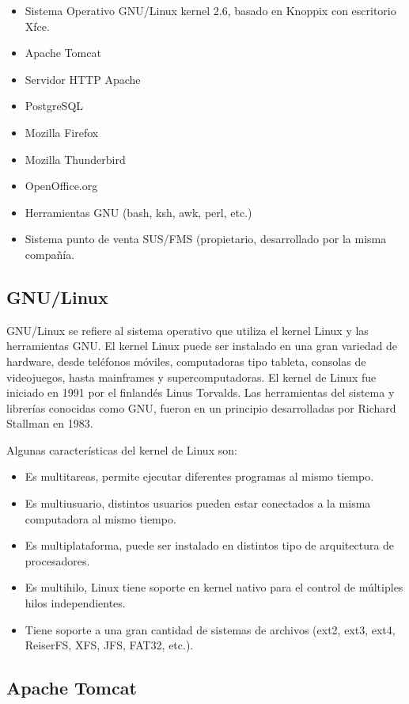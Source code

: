 \begin{itemize}
 \item Sistema Operativo GNU/Linux kernel 2.6, basado en Knoppix con escritorio Xfce.
 \item Apache Tomcat
 \item Servidor HTTP Apache
 \item PostgreSQL
 \item Mozilla Firefox
 \item Mozilla Thunderbird
 \item OpenOffice.org
 \item Herramientas GNU (bash, ksh, awk, perl, etc.)
 \item Sistema punto de venta SUS/FMS (propietario, desarrollado por la misma compañía.
\end{itemize}

\subsection{GNU/Linux}
\label{sec:linux}

GNU/Linux se refiere al sistema operativo que utiliza el kernel Linux y las herramientas GNU. El kernel Linux puede ser instalado en una gran variedad de hardware, desde teléfonos móviles, computadoras tipo tableta, consolas de videojuegos, hasta mainframes y supercomputadoras. El kernel de Linux fue iniciado en 1991 por el finlandés Linus Torvalds. Las herramientas del sistema y librerías conocidas como GNU, fueron en un principio desarrolladas por Richard Stallman en 1983.

Algunas características del kernel de Linux son:

\begin{itemize}
 \item Es multitareas, permite ejecutar diferentes programas al mismo tiempo.
 \item Es multiusuario, distintos usuarios pueden estar conectados a la misma computadora al mismo tiempo.
 \item Es multiplataforma, puede ser instalado en distintos tipo de arquitectura de procesadores.
 \item Es multihilo, Linux tiene soporte en kernel nativo para el control de múltiples hilos independientes.
 \item Tiene soporte a una gran cantidad de sistemas de archivos (ext2, ext3, ext4, ReiserFS, XFS, JFS, FAT32, etc.).
\end{itemize}


\subsection{Apache Tomcat}
\label{sec:tomcat}

